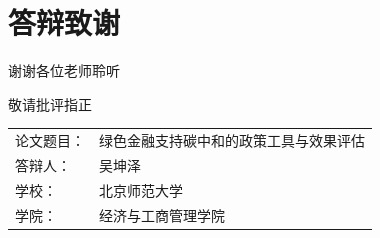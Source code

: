 \section{答辩致谢}

\begin{frame}[plain]
  \centering
  \vspace{1.8cm}
  {\color{CsuBlue}谢谢各位老师聆听\par}
  \vspace{0.6cm}
  {\color{CsuTeal}敬请批评指正\par}
  \vspace{1.2cm}
  \begin{tabular}{@{}ll@{}}
    论文题目： & 绿色金融支持碳中和的政策工具与效果评估 \\
    答辩人： & 吴坤泽 \\
    学校： & 北京师范大学 \\
    学院： & 经济与工商管理学院
  \end{tabular}
\end{frame}
